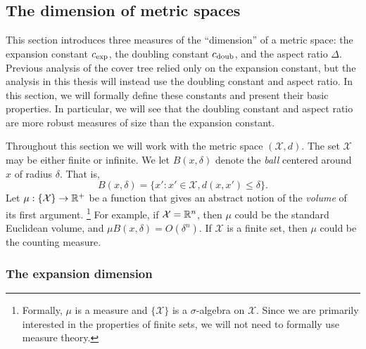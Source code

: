 \documentclass[../main.tex]{subfiles}
\newcommand{\set}[1]{\mathcal {#1}}
\newcommand{\dist}[2]{\distf({#1},{#2})}
\newcommand{\distf}{d}
\newcommand{\aspect}[1]{\Delta}
\newcommand{\krnum}{c_\textnormal{exp}}
\newcommand{\doubnum}{c_\textnormal{doub}}
\begin{document}
\subsection{The dimension of metric spaces}

This section introduces three measures of the ``dimension'' of a metric space:
the expansion constant $\krnum$, the doubling constant $\doubnum$, and the aspect ratio $\aspect{}$.
Previous analysis of the cover tree relied only on the expansion constant,
but the analysis in this thesis will instead use the doubling constant and aspect ratio.
In this section, we will formally define these constants and present their basic properties.
In particular, we will see that the doubling constant and aspect ratio are more robust measures of size than the expansion constant.

Throughout this section we will work with the metric space $(\set X,d)$.
The set $\set X$ may be either finite or infinite.
We let $B(x,\delta)$ denote the \emph{ball} centered around $x$ of radius $\delta$. 
That is,
\begin{equation}
    B(x,\delta) = \{ x' : x'\in\set X, \dist{x}{x'} \le \delta \}.
\end{equation}
Let $\mu : \{\set X\} \to \R^+$ be a function that gives an abstract notion of the \emph{volume} of its first argument.%
\footnote{
    Formally, $\mu$ is a measure and $\{\set X\}$ is a $\sigma$-algebra on $\set X$.
    Since we are primarily interested in the properties of finite sets,
    we will not need to formally use measure theory.
}
For example, if $\set X=\R^n$, then $\mu$ could be the standard Euclidean volume,
and $\mu B(x,\delta) = O(\delta^n)$.
If $\set X$ is a finite set, then $\mu$ could be the counting measure.


\subsubsection{The expansion dimension}
\end{document}
